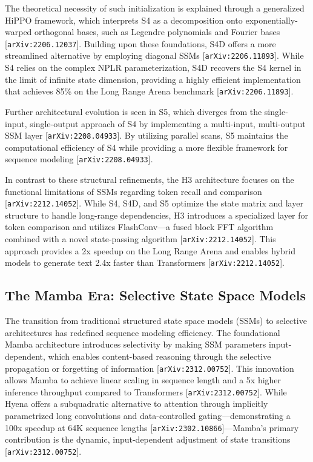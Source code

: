 \documentclass[11pt]{article}
\begin{document}
The theoretical necessity of such initialization is explained through a generalized HiPPO framework, which interprets S4 as a decomposition onto exponentially-warped orthogonal bases, such as Legendre polynomials and Fourier bases [\texttt{arXiv:2206.12037}]. Building upon these foundations, S4D offers a more streamlined alternative by employing diagonal SSMs [\texttt{arXiv:2206.11893}]. While S4 relies on the complex NPLR parameterization, S4D recovers the S4 kernel in the limit of infinite state dimension, providing a highly efficient implementation that achieves 85\% on the Long Range Arena benchmark [\texttt{arXiv:2206.11893}].

Further architectural evolution is seen in S5, which diverges from the single-input, single-output approach of S4 by implementing a multi-input, multi-output SSM layer [\texttt{arXiv:2208.04933}]. By utilizing parallel scans, S5 maintains the computational efficiency of S4 while providing a more flexible framework for sequence modeling [\texttt{arXiv:2208.04933}].

In contrast to these structural refinements, the H3 architecture focuses on the functional limitations of SSMs regarding token recall and comparison [\texttt{arXiv:2212.14052}]. While S4, S4D, and S5 optimize the state matrix and layer structure to handle long-range dependencies, H3 introduces a specialized layer for token comparison and utilizes FlashConv—a fused block FFT algorithm combined with a novel state-passing algorithm [\texttt{arXiv:2212.14052}]. This approach provides a 2x speedup on the Long Range Arena and enables hybrid models to generate text 2.4x faster than Transformers [\texttt{arXiv:2212.14052}].

\subsection{The Mamba Era: Selective State Space Models}

The transition from traditional structured state space models (SSMs) to selective architectures has redefined sequence modeling efficiency. The foundational Mamba architecture introduces selectivity by making SSM parameters input-dependent, which enables content-based reasoning through the selective propagation or forgetting of information [\texttt{arXiv:2312.00752}]. This innovation allows Mamba to achieve linear scaling in sequence length and a 5x higher inference throughput compared to Transformers [\texttt{arXiv:2312.00752}]. While Hyena offers a subquadratic alternative to attention through implicitly parametrized long convolutions and data-controlled gating—demonstrating a 100x speedup at 64K sequence lengths [\texttt{arXiv:2302.10866}]—Mamba’s primary contribution is the dynamic, input-dependent adjustment of state transitions [\texttt{arXiv:2312.00752}].
\end{document}
